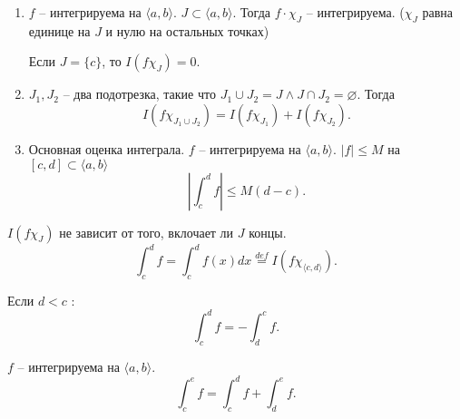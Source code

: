 \documentclass[12pt]{report}
\begin{document}
\begin{prop}
\begin{enumerate}
\begin{proof}
	Получаем \[
	    \begin{array}{c}
		\slim_{J \in  \Sigma} |J| osc_J f \le  \varepsilon \\
		\slim_{J \in  \Sigma} |J| osc_J g \le  \varepsilon 
	\end{array}
	.\] 
	Тогда $ \forall  J \in  \Sigma: osc_J (f g) \le  C \cdot osc_J g + D \cdot osc_J f$.

	Следовательно, \[
	    \slim_{J \in  \Sigma} |J| \cdot osc_J fg \le C \cdot \slim_J |J| \cdot osc_J g + D \cdot \slim_J | J| \cdot osc_J f \le  (C + D ) \varepsilon 
	.\] 
    \end{proof}
    \item
    $ f$ -- интегрируема на $ \langle a, b \rangle$. $ J \subset  \langle a, b \rangle$.
    Тогда $ f \cdot \chi_J $ -- интегрируема. ($ \chi_J$ равна единице на  $ J$ и нулю на остальных точках)

    Если $ J = \{c\}$, то $ I(f \chi_J)  = 0$.
\item $ J_1, J_2$ -- два подотрезка, такие что $ J_1 \cup  J_2 = J \wedge J \cap  J_2 = \varnothing$. Тогда 
    \[
	I(f \chi_{J_1 \cup J_2}) = I(f \chi_{J_1}) + I(f \chi _{J_2})
    .\] 
\item Основная оценка интеграла.
    $ f$ -- интегрируема на $ \langle a, b \rangle$.
    $ |f | \le M$ на $ [c, d] \subset \langle a, b \rangle$
    \[
	\left| \int_c ^{ d} f \right| \le  M(d-c)
    .\] 
    \end{enumerate}
\end{prop}
\begin{name}
    $ I(f \chi_J)$ не зависит от того, вклочает ли $ J$ концы.
    \[
	\int_c^{d} f  =  \int_c^{d} f(x) dx\stackrel{def} =  I(f \chi _ {\langle c, d \rangle})
    .\] 
\end{name}
\begin{name}
    Если $ d < c$ :
    \[
    \int_c^{d} f = - \int_d ^{c} f
    .\] 
\end{name}
\begin{st}
    $ f$ -- интегрируема на $ \langle a, b \rangle$.
    \[
    \int_c ^{e} f = \int _c^{ d} f+ \int_d ^{e} f
    .\] 
\end{st}
\end{document}
